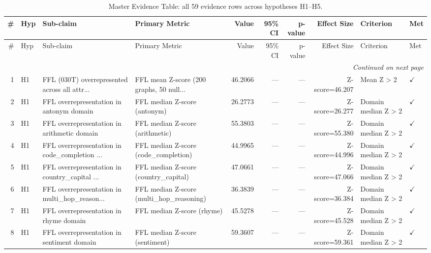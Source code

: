 \documentclass[11pt,a4paper]{article}
\begin{document}
\begin{landscape}
\scriptsize
\setlength{\LTpre}{0pt}
\setlength{\LTpost}{0pt}
\begin{longtable}{rlp{3.2cm}p{3cm}rrrrp{1.5cm}l}
\caption{Master Evidence Table: all 59 evidence rows across hypotheses H1--H5.}\label{tab:evidence}\\
\toprule
\# & Hyp & Sub-claim & Primary Metric & Value & 95\% CI & p-value & Effect Size & Criterion & Met \\
\midrule
\endfirsthead
\toprule
\# & Hyp & Sub-claim & Primary Metric & Value & 95\% CI & p-value & Effect Size & Criterion & Met \\
\midrule
\endhead
\midrule
\multicolumn{10}{r}{\textit{Continued on next page}} \\
\endfoot
\bottomrule
\endlastfoot
\rowcolor{rowgray}
1 & H1 & FFL (030T) overrepresented across all attr... & FFL mean Z-score (200 graphs, 50 null... & 46.2066 & --- & --- & Z-score=46.207 & Mean Z \textgreater{} 2 & $\checkmark$ \\
2 & H1 & FFL overrepresentation in antonym domain & FFL median Z-score (antonym) & 26.2773 & --- & --- & Z-score=26.277 & Domain median Z \textgreater{} 2 & $\checkmark$ \\
\rowcolor{rowgray}
3 & H1 & FFL overrepresentation in arithmetic domain & FFL median Z-score (arithmetic) & 55.3803 & --- & --- & Z-score=55.380 & Domain median Z \textgreater{} 2 & $\checkmark$ \\
4 & H1 & FFL overrepresentation in code\_completion ... & FFL median Z-score (code\_completion) & 44.9965 & --- & --- & Z-score=44.996 & Domain median Z \textgreater{} 2 & $\checkmark$ \\
\rowcolor{rowgray}
5 & H1 & FFL overrepresentation in country\_capital ... & FFL median Z-score (country\_capital) & 47.0661 & --- & --- & Z-score=47.066 & Domain median Z \textgreater{} 2 & $\checkmark$ \\
6 & H1 & FFL overrepresentation in multi\_hop\_reason... & FFL median Z-score (multi\_hop\_reasoning) & 36.3839 & --- & --- & Z-score=36.384 & Domain median Z \textgreater{} 2 & $\checkmark$ \\
\rowcolor{rowgray}
7 & H1 & FFL overrepresentation in rhyme domain & FFL median Z-score (rhyme) & 45.5278 & --- & --- & Z-score=45.528 & Domain median Z \textgreater{} 2 & $\checkmark$ \\
8 & H1 & FFL overrepresentation in sentiment domain & FFL median Z-score (sentiment) & 59.3607 & --- & --- & Z-score=59.361 & Domain median Z \textgreater{} 2 & $\checkmark$ \\

\end{longtable}
\end{landscape}
\end{document}
